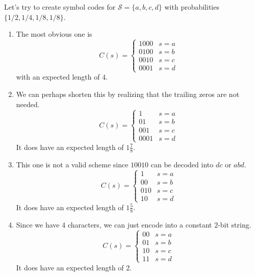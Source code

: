\documentclass{article}
\begin{document}
    \begin{example}
      Let's try to create symbol codes for $\mathcal{S} = \{a, b, c, d\}$ with probabilities $\{1/2, 1/4, 1/8, 1/8\}$. 
      \begin{enumerate}
        \item The most obvious one is 
        \begin{equation}
          C (s) = \begin{cases} 1000 & s = a \\ 0100 & s = b \\ 0010 & s = c \\ 0001 & s = d \end{cases}
        \end{equation}
        with an expected length of $4$. 

        \item We can perhaps shorten this by realizing that the trailing zeros are not needed. 
        \begin{equation}
          C (s) = \begin{cases} 1 & s = a \\ 01 & s = b \\ 001 & s = c \\ 0001 & s = d \end{cases}
        \end{equation}
        It does have an expected length of $1\frac{7}{8}$. 

        \item This one is not a valid scheme since $10010$ can be decoded into $dc$ or $abd$. 
        \begin{equation}
          C (s) = \begin{cases} 1 & s = a \\ 00 & s = b \\ 010 & s = c \\ 10 & s = d \end{cases}
        \end{equation}
        It does have an expected length of $1\frac{5}{8}$. 

        \item Since we have 4 characters, we can just encode into a constant 2-bit string.   
        \begin{equation}
          C (s) = \begin{cases} 00 & s = a \\ 01 & s = b \\ 10 & s = c \\ 11 & s = d \end{cases}
        \end{equation}
        It does have an expected length of $2$. 


\end{enumerate}
\end{example}
\end{document}
